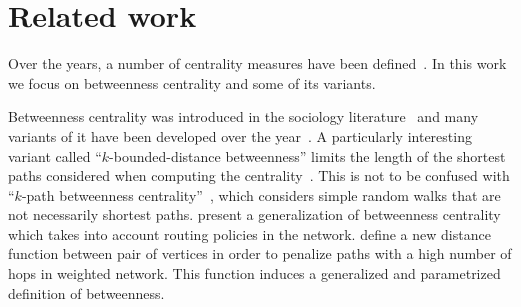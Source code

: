 \section{Related work}\label{sec:prevwork}
Over the years, a number of centrality measures have been defined~\citep{Newman10}. In this work
we focus on betweenness centrality and some of its variants. 

Betweenness centrality was introduced in the sociology
literature~\citep{Anthonisse71,Freeman77} and many variants of it have been
developed over the year~\citet{Brandes08}. A particularly interesting variant
called ``$k$-bounded-distance betweenness'' limits the length of the shortest
paths considered when computing the
centrality~\citep{BorgattiE06,Brandes08,PfefferC12}. This is not to be confused
with ``$k$-path betweenness centrality''~\citet{KourtellisASIT12}, which
considers simple random walks that are not necessarily shortest paths.
\citet{DolevEP10} present a generalization of betweenness centrality which takes
into account routing policies in the network. \citet{OpsahlAS10} define a new
distance function between pair of vertices in order to penalize paths with a
high number of hops in weighted network. This function induces a generalized and
parametrized definition of betweenness.

